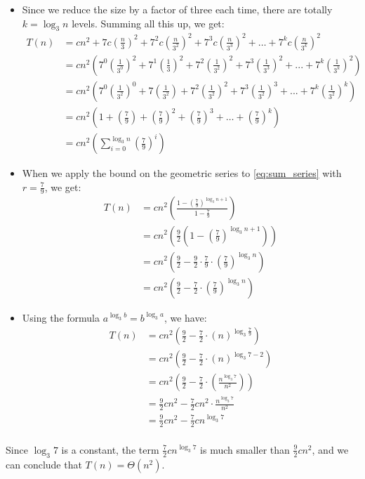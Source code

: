 \documentclass{article}
\begin{document}
	\begin{itemize}
		\item Since we reduce the size by a factor of three each time, there are totally \( k = \log_3n\) levels. Summing all this up, we get:
		\begin{align}
			T(n) &= cn^2 + 7c\left(\frac{n}{3}\right)^2 + 7^2c\left(\frac{n}{3^2}\right)^2 + 7^3c\left(\frac{n}{3^3}\right)^2 + \ldots + 7^kc\left(\frac{n}{3^k}\right)^2 \label{eq:initial_sum} \\
				 &=  cn^2 \left( 7^0 \left(\frac{1}{3^0}\right)^2 + 7^1 \left(\frac{1}{3}\right)^2 +  7^2 \left(\frac{1}{3^2}\right)^2 + 7^3 \left(\frac{1}{3^3}\right)^2 + ... + 7^k \left(\frac{1}{3^k}\right)^2 \right) \\
				 &=  cn^2 \left( 7^0 \left(\frac{1}{3^2}\right)^0 + 7 \left(\frac{1}{3^2}\right) +  7^2 \left(\frac{1}{3^2}\right)^2 + 7^3 \left(\frac{1}{3^2}\right)^3 + ... + 7^k \left(\frac{1}{3^2}\right)^k \right) \\
				 &=  cn^2 \left( 1 + \left(\frac{7}{9}\right) +  \left(\frac{7}{9}\right)^2 + \left(\frac{7}{9}\right)^3 + \ldots + \left(\frac{7}{9}\right)^k \right) \\
				 &= cn^2 \left( \sum_{i = 0}^{\log_{3}n} \left(\frac{7}{9}\right)^i \right) \label{eq:sum_series}
		\end{align}
		\item When we apply the bound on the geometric series to \eqref{eq:sum_series} with \( r = \frac{7}{9} \), we get:
		\begin{align}
			T(n) &= cn^2 \left( \frac{1 - \left(\frac{7}{9}\right)^{\log_3n + 1}}{1 - \frac{7}{9}} \right) \\
				 &= cn^2 \left( \frac{9}{2} \left( 1 - \left(\frac{7}{9}\right)^{\log_3n + 1} \right) \right) \\
				 &= cn^2 \left( \frac{9}{2} - \frac{9}{2} \cdot \frac{7}{9} \cdot \left(\frac{7}{9}\right)^{\log_3n} \right) \\
				 &=  cn^2 \left( \frac{9}{2} - \frac{7}{2} \cdot \left(\frac{7}{9}\right)^{\log_3n} \right)
		\end{align}
		\item Using the formula \( a^{\log_3b} = b^{\log_3a} \), we have:
		\begin{align*}
			T(n) &=  cn^2 \left( \frac{9}{2} - \frac{7}{2} \cdot \left(n\right)^{\log_3\frac{7}{9}} \right) \\
				 &= cn^2 \left( \frac{9}{2} - \frac{7}{2} \cdot \left(n\right)^{\log_3 7 - 2} \right) \\
				 &= cn^2 \left( \frac{9}{2} - \frac{7}{2} \cdot \left(\frac{n^{\log_3 7}}{n^2}\right) \right) \\
				 &= \frac{9}{2}cn^2 - \frac{7}{2}cn^2 \cdot \frac{n^{\log_3 7}}{n^2} \\
				 &= \frac{9}{2}cn^2 - \frac{7}{2}cn^{\log_3 7} \\
		\end{align*}
	\end{itemize}
	Since \(\log_3 7\) is a constant, the term \(\frac{7}{2}cn^{\log_3 7}\) is much smaller than \(\frac{9}{2}cn^2\), and we can conclude that \(T(n) = \Theta(n^{2})\).
\end{document}
